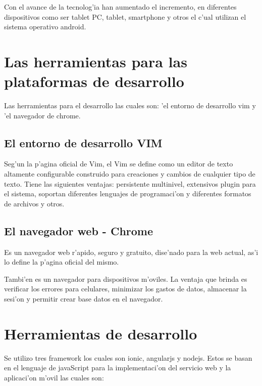 Con el avance de la tecnolog'ia han aumentado el incremento, en diferentes dispositivos como ser tablet PC, tablet, smartphone y otros el c'ual utilizan el sistema operativo android. 


\section{Las herramientas para las plataformas de desarrollo}
Las herramientas  para el desarrollo las cuales son: 'el entorno de desarrollo vim y 'el navegador de chrome.

\subsection{El entorno de desarrollo VIM}
Seg'un la p'agina oficial de Vim, el Vim se define como un editor de texto altamente configurable construido para creaciones y cambios de cualquier tipo de texto. Tiene las siguientes ventajas: persistente multinivel, extensivos plugin para el sistema, soportan diferentes lenguajes de programaci'on y diferentes formatos de archivos y otros.
\subsection{El navegador web - Chrome}
Es un navegador web r'apido, seguro y gratuito, dise'nado para la web actual, as'i lo define la p'agina oficial del mismo.
 
Tambi'en es un navegador para dispositivos m'oviles.  La ventaja que brinda es verificar los errores para celulares, minimizar los gastos de datos, almacenar la sesi'on y permitir crear base datos en el navegador.

\section{Herramientas de desarrollo}
Se utilizo tres framework los cuales son ionic, angularjs y nodejs. Estos se basan en el lenguaje de javaScript para la implementaci'on del servicio web y la aplicaci'on  m'ovil las cuales son:

